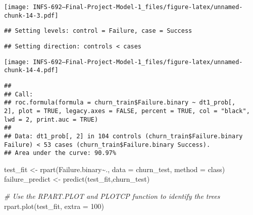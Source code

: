 \documentclass[
]{article}
\newenvironment{Shaded}{\begin{snugshade}}{\end{snugshade}}
\newcommand{\AttributeTok}[1]{\textcolor[rgb]{0.77,0.63,0.00}{#1}}
\newcommand{\CommentTok}[1]{\textcolor[rgb]{0.56,0.35,0.01}{\textit{#1}}}
\newcommand{\ConstantTok}[1]{\textcolor[rgb]{0.00,0.00,0.00}{#1}}
\newcommand{\DecValTok}[1]{\textcolor[rgb]{0.00,0.00,0.81}{#1}}
\newcommand{\FunctionTok}[1]{\textcolor[rgb]{0.00,0.00,0.00}{#1}}
\newcommand{\NormalTok}[1]{#1}
\newcommand{\OtherTok}[1]{\textcolor[rgb]{0.56,0.35,0.01}{#1}}
\newcommand{\SpecialCharTok}[1]{\textcolor[rgb]{0.00,0.00,0.00}{#1}}
\newcommand{\StringTok}[1]{\textcolor[rgb]{0.31,0.60,0.02}{#1}}
\begin{document}
\texttt{[image: INFS-692---Final-Project-Model-1\_files/figure-latex/unnamed-chunk-14-3.pdf]}

\begin{Shaded}
\end{Shaded}

\begin{verbatim}
## Setting levels: control = Failure, case = Success
\end{verbatim}

\begin{verbatim}
## Setting direction: controls < cases
\end{verbatim}

\texttt{[image: INFS-692---Final-Project-Model-1\_files/figure-latex/unnamed-chunk-14-4.pdf]}

\begin{verbatim}
## 
## Call:
## roc.formula(formula = churn_train$Failure.binary ~ dt1_prob[,     2], plot = TRUE, legacy.axes = FALSE, percent = TRUE, col = "black",     lwd = 2, print.auc = TRUE)
## 
## Data: dt1_prob[, 2] in 104 controls (churn_train$Failure.binary Failure) < 53 cases (churn_train$Failure.binary Success).
## Area under the curve: 90.97%
\end{verbatim}

\begin{Shaded}
\begin{Highlighting}[]
\NormalTok{test\_fit }\OtherTok{\textless{}{-}} \FunctionTok{rpart}\NormalTok{(Failure.binary}\SpecialCharTok{\textasciitilde{}}\NormalTok{., }\AttributeTok{data =}\NormalTok{ churn\_test, }\AttributeTok{method =} \StringTok{\textquotesingle{}class\textquotesingle{}}\NormalTok{)}
\NormalTok{failure\_predict }\OtherTok{\textless{}{-}} \FunctionTok{predict}\NormalTok{(test\_fit,churn\_test)}


\CommentTok{\#    Use the RPART.PLOT and PLOTCP function to identify the trees}
\FunctionTok{rpart.plot}\NormalTok{(test\_fit, }\AttributeTok{extra =}  \DecValTok{100}\NormalTok{)}
\end{Highlighting}
\end{Shaded}
\end{document}
